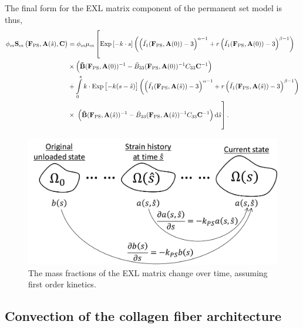     The final form for the EXL matrix component of the permanent set model is thus,
\begin{equation}
\begin{split}
\phi_m \mathbf{S}_m \left(\mathbf{F}_\mathrm{PS}, \mathbf{A}(\hat{s}),\mathbf{C}\right) &= \phi_m \mu_m \left[ \vphantom{\int\displaylimits_0^s} \mathrm{Exp}\left[-k  \cdot s\right]  \left(\left( \bar{I_1} (\mathbf{F}_\mathrm{PS}, \mathbf{A}(0)) - 3\right)^{\alpha - 1} + r \left( \bar{I_1} (\mathbf{F}_\mathrm{PS}, \mathbf{A}(0)) - 3\right)^{\beta - 1}\right)  \right.\\
&\times \left( \mathbf{\tilde{B}}(\mathbf{F}_\mathrm{PS}, \mathbf{A}(0))^{-1} - \tilde{B}_{33}(\mathbf{F}_\mathrm{PS}, \mathbf{A}(0))^{-1}C_{33}\mathbf{C}^{-1}\right) \\
&+ \int\displaylimits_0^s k \cdot \mathrm{Exp}\left[-k (s - \hat{s})\right] \left(\left( \bar{I_1} (\mathbf{F}_\mathrm{PS}, \mathbf{A}(\hat{s})) - 3\right)^{\alpha - 1} + r \left( \bar{I_1} (\mathbf{F}_\mathrm{PS}, \mathbf{A}(\hat{s})) - 3\right)^{\beta - 1}\right) \\
&\times \left. \vphantom{\int\displaylimits_-^s} \left( \mathbf{\tilde{B}}(\mathbf{F}_\mathrm{PS}, \mathbf{A}(\hat{s}))^{-1} - \tilde{B}_{33}(\mathbf{F}_\mathrm{PS}, \mathbf{A}(\hat{s}))^{-1}C_{33}\mathbf{C}^{-1}\right) \mathrm{d}\hat{s}\right].
\end{split}
\end{equation}

\begin{figure}[hbt]
\centering
\includegraphics[width=4.5in]{Images/chapter4/figure9}
\caption{The mass fractions of the EXL matrix change over time, assuming first order kinetics. }
\label{fig:masstransfer}
\end{figure}


\subsection{Convection of the collagen fiber architecture} \label{sec:convection}

